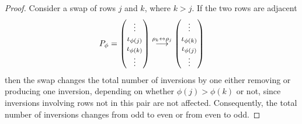 \begin{proof}
Consider a swap of rows $j$ and $k$, where $k>j$.
If the two rows are adjacent
\begin{equation*}
   P_{\phi}=
   \begin{pmatrix}
     \vdots           \\
     \iota_{\phi(j)}  \\
     \iota_{\phi(k)}  \\
     \vdots
   \end{pmatrix}
 \mathrel{ \mathop{\longrightarrow}\limits^{\rho_k\leftrightarrow\rho_j\mathstrut}_{ \begin{subarray}{l} \relax \end{subarray}}}
   \begin{pmatrix}
     \vdots           \\
     \iota_{\phi(k)}  \\
     \iota_{\phi(j)}  \\
     \vdots
   \end{pmatrix}
\end{equation*}
then the swap changes the total number of inversions by one \Dash 
either removing or producing one inversion, depending on whether
\( \phi(j)>\phi(k) \) or not, since inversions involving rows not in this pair
are not affected.
Consequently, the total number of inversions changes from odd to even 
or from even to odd.


\end{proof}
